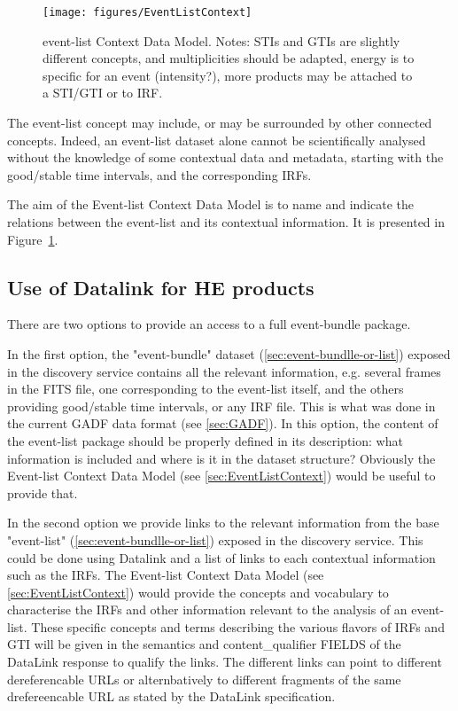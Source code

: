 \documentclass[11pt,a4paper]{ivoa}
\begin{document}
\begin{figure}
\centering
\texttt{[image: figures/EventListContext]}
\caption{event-list Context Data Model. Notes: STIs and GTIs are slightly different concepts, and multiplicities should be adapted, energy is to specific for an event (intensity?), more products may be attached to a STI/GTI or to IRF.}
\label{fig:EventListContext}
\end{figure}

The event-list concept may include, or may be surrounded by other connected concepts. Indeed, an event-list dataset alone cannot be scientifically analysed without the knowledge of some contextual data and metadata, starting with the good/stable time intervals, and the corresponding IRFs.

The aim of the Event-list Context Data Model is to name and indicate the relations between the event-list and its contextual information. It is presented in Figure~\ref{fig:EventListContext}.


\subsection{Use of Datalink for HE products}
\label{sec:datalink}
There are two options to provide an access to a full event-bundle package.

In the first option, the "event-bundle" dataset (\ref{sec:event-bundlle-or-list}) exposed in the discovery service  contains all the relevant information, e.g. several frames in the FITS file, one corresponding to the event-list itself, and the others providing good/stable time intervals, or any IRF file. This is what was done in the current GADF data format (see \ref{sec:GADF}). In this option, the content of the event-list package should be properly defined in its description: what information is included and where is it in the dataset structure? Obviously the Event-list Context Data Model (see \ref{sec:EventListContext}) would be useful to provide that.

In the second option we provide links to the relevant information from the base "event-list" (\ref{sec:event-bundlle-or-list}) exposed in the discovery service. This could be done using Datalink and a list of links to each contextual information such as the IRFs. The Event-list Context Data Model (see \ref{sec:EventListContext}) would provide the concepts and vocabulary to characterise the IRFs and other information relevant to the analysis of an event-list. These specific concepts and terms describing the various flavors of IRFs and GTI will be given in the semantics and content\_qualifier FIELDS of the DataLink response to qualify the links. The different links can point to different
dereferencable URLs or alternbatively to different fragments of the same drefereencable URL as stated by the DataLink specification.
\end{document}
